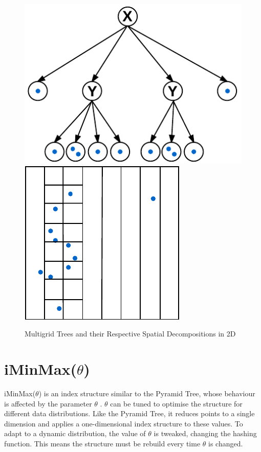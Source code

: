 \begin{figure}
\begin{center}
		\begin{subfloat}{%
			\includegraphics[scale=0.65]{figures/multigrid_levels_tree.pdf}
			\includegraphics[scale=0.65]{figures/multigrid_levels.pdf}
		}
		\end{subfloat}
	\end{center}

	\caption{Multigrid Trees and their Respective Spatial Decompositions in 2D}
	\label{fig:multigrid-trees}
\end{figure}

\section{iMinMax($\theta$)}

iMinMax($\theta$) is an index structure similar to the Pyramid Tree, whose behaviour is affected by the parameter $\theta$ \cite{iminmax}. $\theta$ can be tuned to optimise the structure for different data distributions. Like the Pyramid Tree, it reduces points to a single dimension and applies a one-dimensional index structure to these values. To adapt to a dynamic distribution, the value of $\theta$ is tweaked, changing the hashing function. This means the structure must be rebuild every time $\theta$ is changed.

